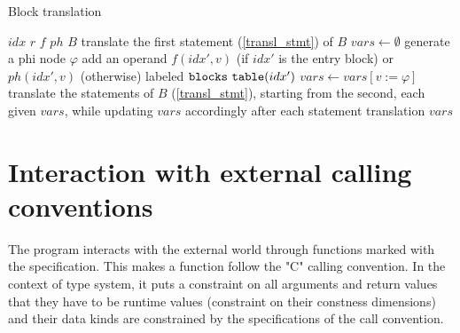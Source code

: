 \begin{algorithm}
    \caption{Block translation}
    \label{transl_block}
    \begin{algorithmic}[1]
        \Require $idx$ 
        \Require $r$ 
        \Require $f$ 
        \Require $ph$ 
        \Require $B$ 
        \State translate the first statement (\cref{transl_stmt}) of $B$ 
        \State $vars \gets \emptyset$ 
            \State generate a phi node $\varphi$
                \State add an operand $f(idx', v)$ (if $idx'$ is the entry block) or $ph(idx', v)$ (otherwise) labeled $\mtt{blocks\ table}(idx')$ 
            \EndFor
            \State $vars \gets vars[v := \varphi]$ 
        \EndFor
        \State translate the statements of $B$ (\cref{transl_stmt}), starting from the second, each given $vars$, while updating $vars$ accordingly after each statement translation
        \State \Return $vars$
    \end{algorithmic}
\end{algorithm}


\section{Interaction with external calling conventions}

The program interacts with the external world through functions marked with the  specification. This makes a function follow the "C" calling convention. In the context of type system, it puts a constraint on all arguments and return values that they have to be runtime values (constraint on their constness dimensions) and their data kinds are constrained by the specifications of the call convention.
